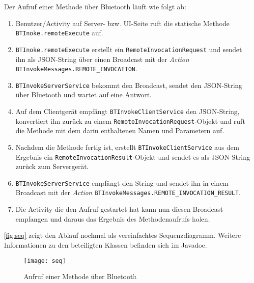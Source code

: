 \begin{minipage}{\linewidth}
Der Aufruf einer Methode über Bluetooth läuft wie folgt ab:
\begin{enumerate}
  \item Benutzer/Activity auf Server- bzw. UI-Seite ruft die statische Methode \lstinline{BTInoke.remoteExecute} auf.
  \item \lstinline{BTInoke.remoteExecute} erstellt ein \lstinline{RemoteInvocationRequest} und sendet ihn als JSON-String über einen Broadcast mit der \emph{Action} \lstinline{BTInvokeMessages.REMOTE_INVOCATION}.
  \item \lstinline{BTInvokeServerService} bekommt den Broadcast, sendet den JSON-String über Bluetooth und wartet auf eine Antwort.
  \item Auf dem Clientgerät empfängt \lstinline{BTInvokeClientService} den JSON-String, konvertiert ihn zurück zu einem \lstinline{RemoteInvocationRequest}-Objekt und ruft die Methode mit dem darin enthaltenen Namen und Parametern auf.
  \item Nachdem die Methode fertig ist, erstellt \lstinline{BTInvokeClientService} aus dem Ergebnis ein \lstinline{RemoteInvocationResult}-Objekt und sendet es als JSON-String zurück zum Servergerät.
  \item \lstinline{BTInvokeServerService} empfängt den String und sendet ihn in einem Broadcast mit der \emph{Action} \lstinline{BTInvokeMessages.REMOTE_INVOCATION_RESULT}.
  \item Die Activity die den Aufruf gestartet hat kann nun diesen Broadcast empfangen und daraus das Ergebnis des Methodenaufrufs holen.
\end{enumerate}
\end{minipage}

\autoref{fig:seq} zeigt den Ablauf nochmal als vereinfachtes Sequenzdiagramm. Weitere Informationen zu den beteiligten Klassen befinden sich im Javadoc.
\begin{figure}[htbp]
  \centering
  \texttt{[image: seq]}
  \caption{Aufruf einer Methode über Bluetooth}
  \label{fig:seq}
\end{figure}

